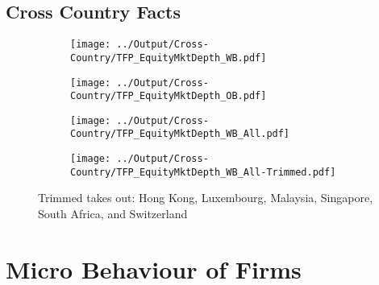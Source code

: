 \documentclass[12pt,notitlepage]{article}
\begin{document}
\clearpage



\FloatBarrier
\subsection{Cross Country Facts} %
\label{sec:cross_country_facts}
\FloatBarrier



\begin{figure}[!htpb]
\centering
\caption{Total Factor Productivity (European Countries)}
\begin{subfigure}{.49\textwidth}
    \centering
 \texttt{[image: ../Output/Cross-Country/TFP\_EquityMktDepth\_WB.pdf]}
\end{subfigure}
\begin{subfigure}{.49\textwidth}
    \centering
  \texttt{[image: ../Output/Cross-Country/TFP\_EquityMktDepth\_OB.pdf]}
\end{subfigure}
\end{figure}
\FloatBarrier




\begin{figure}[!htpb]
\centering
\caption{Total Factor Productivity (All Countries)}
\begin{subfigure}{.49\textwidth}
    \centering
 \texttt{[image: ../Output/Cross-Country/TFP\_EquityMktDepth\_WB\_All.pdf]}
\end{subfigure}
\begin{subfigure}{.49\textwidth}
    \centering
  \texttt{[image: ../Output/Cross-Country/TFP\_EquityMktDepth\_WB\_All-Trimmed.pdf]}
\end{subfigure}
Trimmed takes out: Hong Kong, Luxembourg, Malaysia, Singapore, South Africa, and Switzerland
\end{figure}





\FloatBarrier
\section{Micro Behaviour of Firms} %
\label{sec:micro_behaviour_of_firms}
\end{document}
